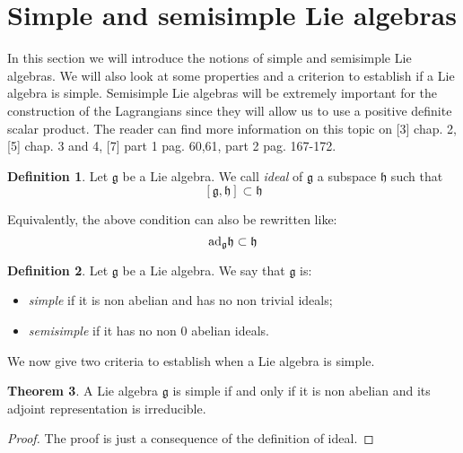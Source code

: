 \documentclass[12pt,a4paper]{report}
\theoremstyle{definition}
\newtheorem{Def}{Definition}[chapter]
\theoremstyle{Theorem}
\newtheorem{Theo}[Def]{Theorem}
\theoremstyle{definition}
\theoremstyle{definition}
\begin{document}
	\section{Simple and semisimple Lie algebras}
	In this section we will introduce the notions of simple and semisimple Lie algebras. We will also look at some properties and a criterion to establish if a Lie algebra is simple. Semisimple Lie algebras will be extremely important for the construction of the Lagrangians since they will allow us to use a positive definite scalar product. The reader can find more information on this topic on [3] chap. 2, [5] chap. 3 and 4, [7] part 1 pag. 60,61, part 2 pag. 167-172.
	\begin{Def}
		Let $\mathfrak{g}$ be a Lie algebra. We call \textit{ideal} of $\mathfrak{g}$ a subspace $\mathfrak{h}$ such that 
		$$[\mathfrak{g},\mathfrak{h}]\subset\mathfrak{h}$$
	\end{Def}
	Equivalently, the above condition can also be rewritten like:
	$$\hbox{ad}_\mathfrak{g}\mathfrak{h}\subset\mathfrak{h}$$
	\begin{Def}
		Let $\mathfrak{g}$ be a Lie algebra. We say that $\mathfrak{g}$ is:
		\begin{itemize}
			\item \textit{simple} if it is non abelian and has no non trivial ideals;
			\item \textit{semisimple} if it has no non 0 abelian ideals.
		\end{itemize}
	\end{Def}
	We now give two criteria to establish when a Lie algebra is simple.
	\begin{Theo}
		A Lie algebra $\mathfrak{g}$ is simple if and only if it is non abelian and its adjoint representation is irreducible.
	\end{Theo}
	\begin{proof}
		The proof is just a consequence of the definition of ideal.			
	\end{proof}
\end{document}
